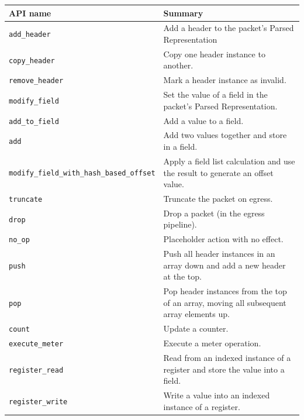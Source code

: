 \documentclass[12pt]{article}
\begin{document}
\begin{table}[H]
\begin{center}
\begin{tabular}{| l | p{} |} \hline
\textbf{API name} &
\textbf{Summary} \\ \hline
\texttt{add_header} &
Add a header to the packet's Parsed Representation \\ \hline
\texttt{copy_header} &
Copy one header instance to another. \\ \hline
\texttt{remove_header} &
Mark a header instance as invalid. \\ \hline
\texttt{modify_field} &
Set the value of a field in the packet's Parsed Representation. \\ \hline
\texttt{add_to_field} &
Add a value to a field. \\ \hline
\texttt{add} &
Add two values together and store in a field. \\ \hline
\texttt{\color{red}modify_field_with_hash_based_offset} &
Apply a field list calculation and use the result to generate an offset value. \\ \hline
\texttt{truncate} &
Truncate the packet on egress. \\ \hline
\texttt{drop} &
Drop a packet (in the egress pipeline). \\ \hline
\texttt{no_op} &
Placeholder action with no effect. \\ \hline
\texttt{push} &
Push all header instances in an array down and add a new header at the top. \\ \hline
\texttt{pop} &
Pop header instances from the top of an array, moving all subsequent array elements up. \\ \hline
\texttt{count} &
Update a counter. \\ \hline
\texttt{\color{red}execute_meter} &
Execute a meter operation. \\ \hline
\texttt{\color{red}register_read} &
{\color{red}Read from an indexed instance of a register and store the value into a field.} \\ \hline
\texttt{\color{red}register_write} &
{\color{red}Write a value into an indexed instance of a register. }\\ \hline


\end{tabular}
\end{center}
\end{table}
\end{document}
